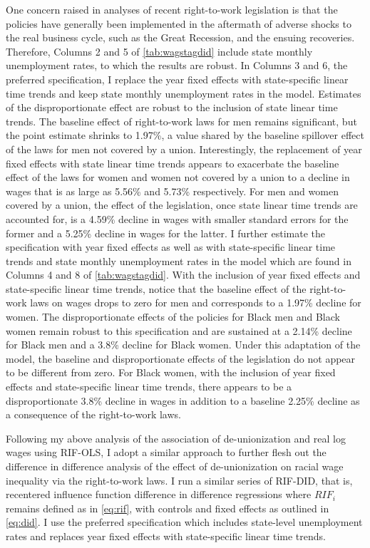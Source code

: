 \documentclass[11pt]{article}
\begin{document}
One concern raised in analyses of recent right-to-work legislation is that the policies have generally been implemented in the aftermath of adverse shocks to the real business cycle, such as the Great Recession, and the ensuing recoveries. Therefore, Columns 2 and 5 of \autoref{tab:wagstagdid} include state monthly unemployment rates, to which the results are robust. In Columns 3 and 6, the preferred specification, I replace the year fixed effects with state-specific linear time trends and keep state monthly unemployment rates in the model. Estimates of the disproportionate effect are robust to the inclusion of state linear time trends. The baseline effect of right-to-work laws for men remains significant, but the point estimate shrinks to 1.97\%, a value shared by the baseline spillover effect of the laws for men not covered by a union. Interestingly, the replacement of year fixed effects with state linear time trends appears to exacerbate the baseline effect of the laws for women and women not covered by a union to a decline in wages that is as large as 5.56\% and 5.73\% respectively. For men and women covered by a union, the effect of the legislation, once state linear time trends are accounted for, is a 4.59\% decline in wages with smaller standard errors for the former and a 5.25\% decline in wages for the latter. I further estimate the specification with year fixed effects as well as with state-specific linear time trends and state monthly unemployment rates in the model which are found in Columns 4 and 8 of \autoref{tab:wagstagdid}. With the inclusion of year fixed effects and state-specific linear time trends, notice that the baseline effect of the right-to-work laws on wages drops to zero for men and corresponds to a 1.97\% decline for women. The disproportionate effects of the policies for Black men and Black women remain robust to this specification and are sustained at a 2.14\% decline for Black men and a 3.8\% decline for Black women. Under this adaptation of the model, the baseline and disproportionate effects of the legislation do not appear to be different from zero. For Black women, with the inclusion of year fixed effects and state-specific linear time trends, there appears to be a disproportionate 3.8\% decline in wages in addition to a baseline 2.25\% decline as a consequence of the right-to-work laws.

Following my above analysis of the association of de-unionization and real log wages using RIF-OLS, I adopt a similar approach to further flesh out the difference in difference analysis of the effect of de-unionization on racial wage inequality via the right-to-work laws. I run a similar series of RIF-DID, that is, recentered influence function difference in difference regressions where $RIF_i$ remains defined as in \autoref{eq:rif}, with controls and fixed effects as outlined in \autoref{eq:did}. I use the preferred specification which includes state-level unemployment rates and replaces year fixed effects with state-specific linear time trends. 
\end{document}
